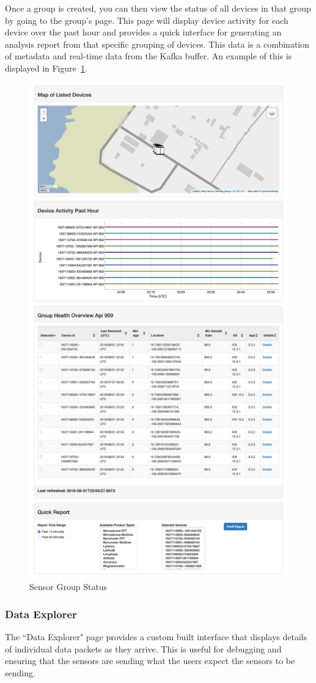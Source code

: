 Once a group is created, you can then view the status of all devices in that group by going to the group's page. This page will display device activity for each device over the past hour and provides a quick interface for generating an analysis report from that specific grouping of devices. This data is a combination of metadata and real-time data from the Kafka buffer. An example of this is displayed in Figure~\ref{fig:lweb_group}.

\begin{figure}
	\centering
	\includegraphics[width=0.7\linewidth]{figures/lweb_group.png}
	\caption{Sensor Group Status}
	\label{fig:lweb_group}
\end{figure}

\subsubsection{Data Explorer}
The ``Data Explorer" page provides a custom built interface that displays details of individual data packets as they arrive. This is useful for debugging and ensuring that the sensors are sending what the users expect the sensors to be sending.

